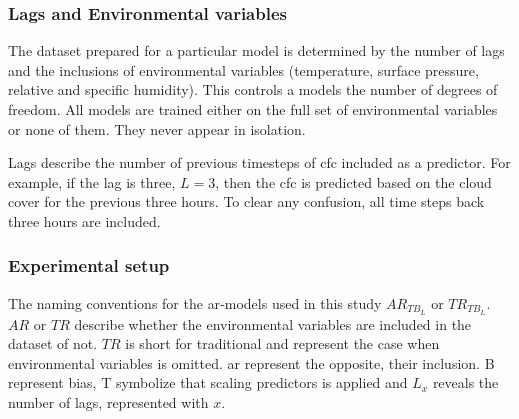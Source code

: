 \subsubsection{Lags and Environmental variables}
The dataset prepared for a particular model is determined by the number of lags and the inclusions of environmental variables (temperature, surface pressure, relative and specific humidity). This controls a models the number of degrees of freedom. All models are trained either on the full set of environmental variables or none of them. They never appear in isolation. 

Lags describe the number of previous timesteps of \acrshort{cfc} included as a predictor. For example, if the lag is three, $L=3$, then the \acrshort{cfc} is predicted based on the cloud cover for the previous three hours. To clear any confusion, all time steps back three hours are included.


\subsubsection{Experimental setup} \label{sec:experiments_ar}
The naming conventions for the \acrshort{ar}-models used in this study $AR_{TB_L}$ or $TR_{TB_L}$. $AR$ or $TR$ describe whether the environmental variables are included in the dataset of not. $TR$ is short for traditional and represent the case when environmental variables is omitted. \acrshort{ar} represent the opposite, their inclusion. B represent bias, T symbolize that scaling predictors is applied and $L_x$ reveals the number of lags, represented with $x$.  

